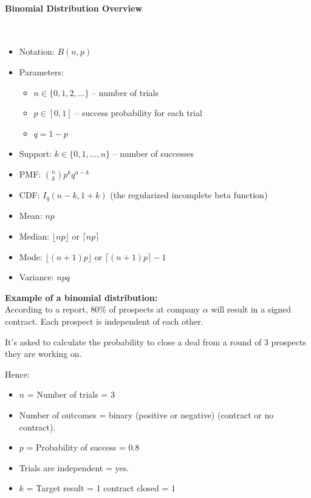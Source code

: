 \documentclass{article}
\begin{document}
\paragraph{Binomial Distribution Overview}\mbox{} \\

\begin{itemize}
    \item Notation: $B(n,p)$
    \item Parameters: 
        \begin{itemize}
            \item $ \displaystyle n\in \{0,1,2,\ldots \} $ – number of trials 
            \item $ \displaystyle p\in [0,1] $ – success probability for each trial
            \item $ {\displaystyle q=1-p} $
        \end{itemize}
    \item Support: $ \displaystyle k\in \{0,1,\ldots ,n\}$ – number of successes 
    \item PMF: $ \displaystyle {\binom {n}{k}}p^{k}q^{n-k} $
    \item CDF: $ \displaystyle I_{q}(n-k,1+k) $ (the regularized incomplete beta function)
    \item Mean: $np$
    \item Median: $\lfloor np \rfloor$  or $\lceil np \rceil $
    \item Mode: $\lfloor (n+1)p \rfloor$  or $\lceil (n+1)p \rceil-1 $
    \item Variance: $npq$ 
\end{itemize}

\textbf{Example of a binomial distribution:} \\

According to a report, 80\% of prospects at company $\alpha$ will result in a signed contract. Each prospect is independent of each other.

It's asked to calculate the probability to close a deal from a round of 3 prospects they are working on.

Hence:
\begin{itemize}
    \item $n$ = Number of trials = 3
    \item Number of outcomes = binary (positive or negative) (contract or no contract).
    \item $p$ = Probability of success = 0.8
    \item Trials are independent = yes.
    \item $k$ = Target result = 1 contract closed = 1
\end{itemize}
\end{document}
